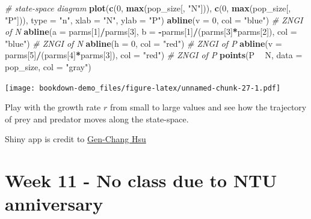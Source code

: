 \documentclass[
]{book}
\newenvironment{Shaded}{\begin{snugshade}}{\end{snugshade}}
\newcommand{\CommentTok}[1]{\textcolor[rgb]{0.56,0.35,0.01}{\textit{#1}}}
\newcommand{\DataTypeTok}[1]{\textcolor[rgb]{0.13,0.29,0.53}{#1}}
\newcommand{\DecValTok}[1]{\textcolor[rgb]{0.00,0.00,0.81}{#1}}
\newcommand{\KeywordTok}[1]{\textcolor[rgb]{0.13,0.29,0.53}{\textbf{#1}}}
\newcommand{\NormalTok}[1]{#1}
\newcommand{\OperatorTok}[1]{\textcolor[rgb]{0.81,0.36,0.00}{\textbf{#1}}}
\newcommand{\StringTok}[1]{\textcolor[rgb]{0.31,0.60,0.02}{#1}}
\begin{document}
\begin{Shaded}
\begin{Highlighting}[]
\CommentTok{# state-space diagram}
\KeywordTok{plot}\NormalTok{(}\KeywordTok{c}\NormalTok{(}\DecValTok{0}\NormalTok{, }\KeywordTok{max}\NormalTok{(pop_size[, }\StringTok{"N"}\NormalTok{])), }\KeywordTok{c}\NormalTok{(}\DecValTok{0}\NormalTok{, }\KeywordTok{max}\NormalTok{(pop_size[, }\StringTok{"P"}\NormalTok{])), }\DataTypeTok{type =} \StringTok{"n"}\NormalTok{, }\DataTypeTok{xlab =} \StringTok{"N"}\NormalTok{, }\DataTypeTok{ylab =} \StringTok{"P"}\NormalTok{)}
\KeywordTok{abline}\NormalTok{(}\DataTypeTok{v =} \DecValTok{0}\NormalTok{, }\DataTypeTok{col =} \StringTok{"blue"}\NormalTok{) }\CommentTok{# ZNGI of N}
\KeywordTok{abline}\NormalTok{(}\DataTypeTok{a =}\NormalTok{ parms[}\DecValTok{1}\NormalTok{]}\OperatorTok{/}\NormalTok{parms[}\DecValTok{3}\NormalTok{], }\DataTypeTok{b =} \OperatorTok{-}\NormalTok{parms[}\DecValTok{1}\NormalTok{]}\OperatorTok{/}\NormalTok{(parms[}\DecValTok{3}\NormalTok{]}\OperatorTok{*}\NormalTok{parms[}\DecValTok{2}\NormalTok{]), }\DataTypeTok{col =} \StringTok{"blue"}\NormalTok{) }\CommentTok{# ZNGI of N}
\KeywordTok{abline}\NormalTok{(}\DataTypeTok{h =} \DecValTok{0}\NormalTok{, }\DataTypeTok{col =} \StringTok{"red"}\NormalTok{) }\CommentTok{# ZNGI of P}
\KeywordTok{abline}\NormalTok{(}\DataTypeTok{v =}\NormalTok{ parms[}\DecValTok{5}\NormalTok{]}\OperatorTok{/}\NormalTok{(parms[}\DecValTok{4}\NormalTok{]}\OperatorTok{*}\NormalTok{parms[}\DecValTok{3}\NormalTok{]), }\DataTypeTok{col =} \StringTok{"red"}\NormalTok{) }\CommentTok{# ZNGI of P}
\KeywordTok{points}\NormalTok{(P }\OperatorTok{~}\StringTok{ }\NormalTok{N, }\DataTypeTok{data =}\NormalTok{ pop_size, }\DataTypeTok{col =} \StringTok{"gray"}\NormalTok{)}
\end{Highlighting}
\end{Shaded}

\texttt{[image: bookdown-demo\_files/figure-latex/unnamed-chunk-27-1.pdf]}

Play with the growth rate \(r\) from small to large values and see how the trajectory of prey and predator moves along the state-space.

Shiny app is credit to \href{https://genchanghsu.github.io/index.html}{Gen-Chang Hsu}

\hypertarget{week-11---no-class-due-to-ntu-anniversary}{%
\chapter*{Week 11 - No class due to NTU anniversary}\label{week-11---no-class-due-to-ntu-anniversary}}
\end{document}
